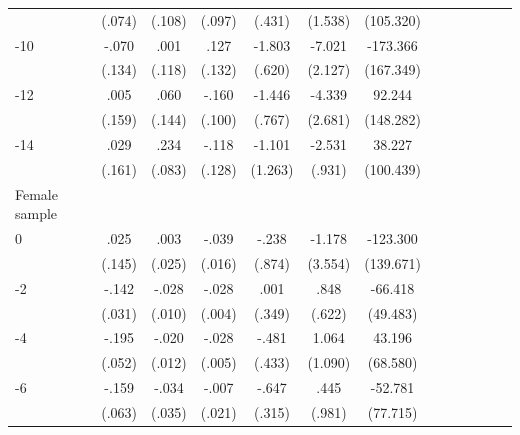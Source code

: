 \begin{table}[p]
\begin{adjustbox}{max width=\linewidth}
\begin{threeparttable}
{\begin{tabular}{l*{6}{SS}}
                &   (.074)         &   (.108)         &   (.097)         &   (.431)         &  (1.538)         &(105.320)         \\
-10            &    -.070         &     .001         &     .127         &   -1.803\sym{***}&   -7.021\sym{***}& -173.366         \\
                &   (.134)         &   (.118)         &   (.132)         &   (.620)         &  (2.127)         &(167.349)         \\
-12           &     .005         &     .060         &    -.160         &   -1.446\sym{*}  &   -4.339         &   92.244         \\
                &   (.159)         &   (.144)         &   (.100)         &   (.767)         &  (2.681)         &(148.282)         \\
-14           &     .029         &     .234\sym{***}&    -.118         &   -1.101         &   -2.531\sym{***}&   38.227         \\
                &   (.161)         &   (.083)         &   (.128)         &  (1.263)         &   (.931)         &(100.439)         \\
\midrule
Female sample &&&&&&\\
0               &     .025         &     .003         &    -.039\sym{**} &    -.238         &   -1.178         & -123.300         \\
                &   (.145)         &   (.025)         &   (.016)         &   (.874)         &  (3.554)         &(139.671)         \\
-2             &    -.142\sym{***}&    -.028\sym{***}&    -.028\sym{***}&     .001         &     .848         &  -66.418         \\
                &   (.031)         &   (.010)         &   (.004)         &   (.349)         &   (.622)         & (49.483)         \\
-4             &    -.195\sym{***}&    -.020\sym{*}  &    -.028\sym{***}&    -.481         &    1.064         &   43.196         \\
                &   (.052)         &   (.012)         &   (.005)         &   (.433)         &  (1.090)         & (68.580)         \\
-6             &    -.159\sym{**} &    -.034         &    -.007         &    -.647\sym{**} &     .445         &  -52.781         \\
                &   (.063)         &   (.035)         &   (.021)         &   (.315)         &   (.981)         & (77.715)         \\

\end{tabular}}
\end{threeparttable}
\end{adjustbox}
\end{table}
